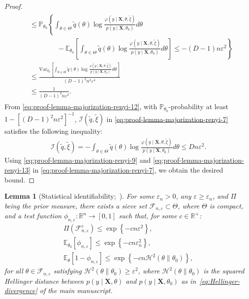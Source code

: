 \documentclass[12pt]{article}
\newtheorem{lemma}{Lemma}[section]
\numberwithin{equation}{section}
\begin{document}
\begin{proof}
\begin{align}
\begin{split}
        &\leq \mathbb{P}_{\theta_{0}}\left\{\int_{\theta\in \Theta} \tilde{q}(\theta)\log\frac{\varphi(y \mid \mathbf{X}, \theta, \tilde{\xi})}{p(y \mid \mathbf{X}, \theta_{0})}d\theta\right.\\
        &\left.\qquad \qquad - \mathbb{E}_{\theta_{0}}\left[\int_{\theta\in \Theta} \tilde{q}(\theta)\log\frac{\varphi(y \mid \mathbf{X}, \theta, \tilde{\xi})}{p(y\mid \mathbf{X}, \theta_{0})}d\theta\right] \leq -(D-1)n\varepsilon^2\right\}\\
        &\leq \frac{\text{Var}_{\theta_{0}} \left[\int_{\theta\in \Theta} \tilde{q}(\theta)\log\frac{\varphi(y\mid \mathbf{X}, \theta, \tilde{\xi})}{p(y\mid \mathbf{X}, \theta_{0})}d\theta\right]}{(D-1)^{2}n^2\varepsilon^4}\\
        &\leq \frac{1}{(D-1)^{2}n\varepsilon^2}.
    \end{split}
\end{align}
From \eqref{eq:proof-lemma-majorization-renyi-12}, with $\mathbb{P}_{\theta_0}$-probability at least $1 - [(D-1)^2n\varepsilon^2]^{-1}$, $\mathcal{I}(\tilde{q} , \tilde{\xi})$ in \eqref{eq:proof-lemma-majorization-renyi-7} 
satisfies the following inequality:
\begin{align}\label{eq:proof-lemma-majorization-renyi-13}
    \mathcal{I}(\tilde{q} , \tilde{\xi}) = -\int_{\theta\in \Theta}\tilde{q}(\theta)\log\frac{\varphi(y\mid \mathbf{X}, \theta, \tilde{\xi})}{p(y\mid \mathbf{X}, \theta_0)}d\theta \leq Dn\varepsilon^2.
\end{align}
%
Using \eqref{eq:proof-lemma-majorization-renyi-9} and \eqref{eq:proof-lemma-majorization-renyi-13} in \eqref{eq:proof-lemma-majorization-renyi-7}, we obtain the desired bound.
\end{proof}

\begin{lemma}[Statistical identifiability;~\cite{ghosal2007convergence}]
\label{lemma:hell-risk-assumption}
For some $\varepsilon_n > 0$, any $\varepsilon \geq \varepsilon_n$, and $\Pi$ being the prior measure, there exists a sieve set $\mathcal{F}_{n, \varepsilon} \subset \Theta$, where $\Theta$ is compact, and a test function $\phi_{n, \varepsilon}:\mathbb{R}^{n} \to [0, 1]$ such that, for some $c\in \mathbb{R}^{+}$:
\begin{gather}\label{eq:hell-risk-assumption-1}
\Pi(\mathcal{F}_{n, \varepsilon}^{c}) \leq \exp\left\{-cn\varepsilon^2\right\},\\
\label{eq:hell-risk-assumption-2}
\mathbb{E}_{\theta_0}\left[\phi_{n, \varepsilon}\right] \leq \exp\left\{-cn \varepsilon_n^2\right\},\\
\label{eq:hell-risk-assumption-3}
\mathbb{E}_{\theta}\left[1 - \phi_{n, \varepsilon}\right] \leq \exp\left\{-c n \mathcal{H}^{2}(\theta \parallel \theta_0)\right\},
\end{gather}
for all $\theta\in \mathcal{F}_{n, \varepsilon}$ satisfying $\mathcal{H}^{2}(\theta\parallel\theta_0) \geq \varepsilon^2$, where $\mathcal{H}^{2}(\theta\parallel\theta_0)$ is the squared Hellinger distance between $p(y\mid \mathbf{X}, \theta)$ and $p(y\mid \mathbf{X}, \theta_0)$ as in~\eqref{eq:Hellinger-divergence} of the main manuscript.
\end{lemma}
\end{document}

